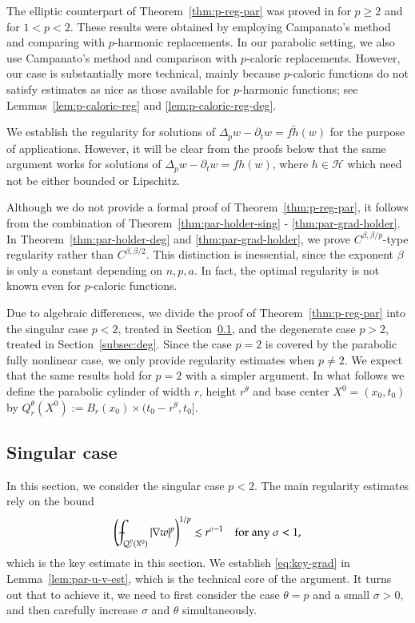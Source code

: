 \documentclass[11pt,oneside,english]{amsart}
\newcommand{\cH}{{\mathcal H}}
\newcommand{\be}{\beta}
\newcommand{\D}{\nabla}
\numberwithin{equation}{section}
\def\Xint#1{\mathchoice
  {\XXint\displaystyle\textstyle{#1}}%
  {\XXint\textstyle\scriptstyle{#1}}%
  {\XXint\scriptstyle\scriptscriptstyle{#1}}%
  {\XXint\scriptscriptstyle\scriptscriptstyle{#1}}%
  \!\int}
\def\XXint#1#2#3{{\setbox0=\hbox{$#1{#2#3}{\int}$}
    \vcenter{\hbox{$#2#3$}}\kern-.5\wd0}}
\def\dashint{\Xint-}
\theoremstyle{plain}
\numberwithin{equation}{section}
\begin{document}
The elliptic counterpart of Theorem~\ref{thm:p-reg-par} was proved in \cite{LeiDeQTei15} for $p\ge2$ and \cite{JeoSha24} for $1<p<2$. These results were obtained by employing Campanato's method and comparing with $p$-harmonic replacements. In our parabolic setting, we also use Campanato's method and comparison with $p$-caloric replacements. However, our case is substantially more technical, mainly because $p$-caloric functions do not satisfy estimates as nice as those available for $p$-harmonic functions; see Lemmas~\ref{lem:p-caloric-reg} and \ref{lem:p-caloric-reg-deg}.

We establish the regularity for solutions of $\Delta_pw -\partial_t w=f\tilde h(w)$ for the purpose of applications. However, it will be clear from the proofs below that the same argument works for solutions of $\Delta_pw -\partial_t w = fh(w)$, where $h \in \cH$ which need not be either bounded or Lipschitz.

Although we do not provide a formal proof of Theorem~\ref{thm:p-reg-par}, it follows from the combination of Theorem~\ref{thm:par-holder-sing} - \ref{thm:par-grad-holder}. In Theorem~\ref{thm:par-holder-deg} and \ref{thm:par-grad-holder}, we prove $C^{\be,\be/p}$-type regularity rather than $C^{\be,\be/2}$. This distinction is inessential, since the exponent $\be$ is only a constant depending on $n,p,a$. In fact, the optimal regularity is not known even for $p$-caloric functions.

Due to algebraic differences, we divide the proof of Theorem~\ref{thm:p-reg-par} into the singular case $p<2$, treated in Section~\ref{subsec:sing}, and the degenerate case $p>2$, treated in Section~\ref{subsec:deg}. Since the case $p=2$ is covered by the parabolic fully nonlinear case, we only provide regularity estimates when $p\neq2$. We expect that the same results hold for $p=2$ with a simpler argument. In what follows we define  the parabolic cylinder of width $r$, height $r^\theta $ and base center $X^0 =(x_0,t_0)$ 
by   
$Q^\theta_r (X^0):= B_r(x_0)\times (t_0-r^\theta,t_0]$.


\subsection{Singular case}\label{subsec:sing}


In this section, we consider the singular case $p<2$. The main regularity estimates rely on the bound 
\begin{align}
    \label{eq:key-grad}
    \left(\dashint_{Q_r^\theta(X^0)}|\D w|^p\right)^{1/p}\lesssim r^{\sigma-1}\quad\text{for any $\sigma<1$},
\end{align}
which is the key estimate in this section. We establish \eqref{eq:key-grad} in Lemma~\ref{lem:par-u-v-est}, which is the technical core of the argument. It turns out that to achieve it, we need to first consider the case $\theta=p$ and a small $\sigma>0$, and then carefully increase $\sigma$ and $\theta$ simultaneously.
\end{document}
